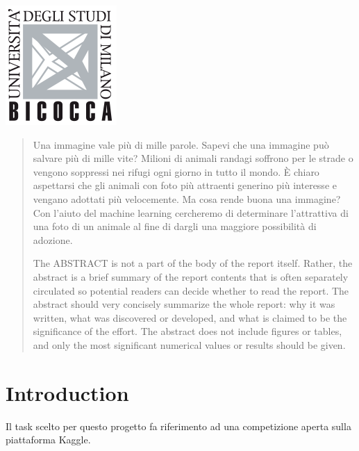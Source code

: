\begin{titlepage}

\includegraphics{logo.png}\\[1cm] %
 

\vfill %

\end{titlepage}


\begin{abstract}
    Una immagine vale più di mille parole. Sapevi che una immagine può salvare più di mille vite? Milioni di animali randagi soffrono per le strade o vengono soppressi nei rifugi ogni giorno in tutto il mondo. È chiaro aspettarsi che gli animali con foto più attraenti generino più interesse e vengano adottati più velocemente. Ma cosa rende buona una immagine? Con l'aiuto del machine learning cercheremo di determinare l'attrattiva di una foto di un animale al fine di dargli una maggiore possibilità di adozione.
    

    The ABSTRACT is not a part of the body of the report itself. Rather, the abstract is a brief summary of the report contents that is often separately circulated so potential readers can decide whether to read the report. The abstract should very concisely summarize the whole report: why it was written, what was discovered or developed, and what is claimed to be the significance of the effort. The abstract does not include figures or tables, and only the most significant numerical values or results should be given.
\end{abstract}

\section{Introduction}
    Il task scelto per questo progetto fa riferimento ad una competizione aperta sulla piattaforma Kaggle.

